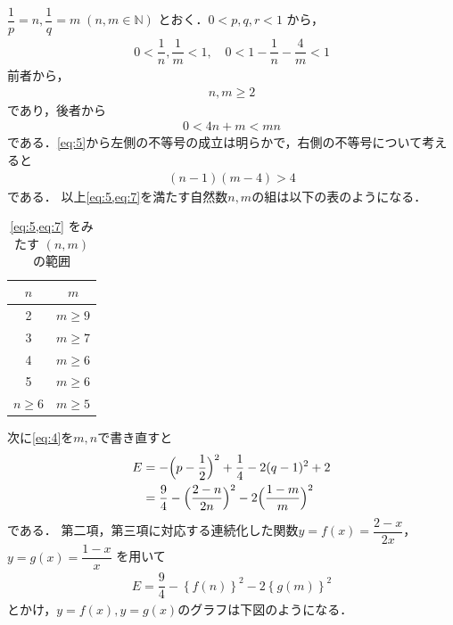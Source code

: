 \documentclass[../../main.tex]{subfiles}
\begin{document}
$\dfrac{1}{p} = n, \dfrac{1}{q} = m \; (n,m \in \mathbb{N})$ とおく．$0 < p, q, r < 1$ から，
\begin{align}
  0 < \dfrac{1}{n}, \dfrac{1}{m} < 1, \quad 0 < 1 - \dfrac{1}{n} - \dfrac{4}{m} < 1
\end{align}
前者から，
\begin{align}
  n, m \ge 2 \label{eq:5}
\end{align}
であり，後者から
\begin{align}
  0 < 4n + m < mn \label{eq:6}
\end{align}
である．\cref{eq:5}から左側の不等号の成立は明らかで，右側の不等号について考えると
\begin{align}
  (n-1)(m-4) > 4 \label{eq:7}
\end{align}
である．
以上\cref{eq:5,eq:7}を満たす自然数$n,m$の組は以下の表のようになる．

\begin{table}[htb]
  \centering
  \caption{\cref{eq:5,eq:7} をみたす $(n,m)$ の範囲}
  \begin{tabular}{c|c}
    $n$ & $m$ \\ \hline
    2 & $m \ge 9$ \\ \hline
    3 & $m \ge 7$ \\ \hline
    4 & $m \ge 6$ \\ \hline
    5 & $m \ge 6$ \\ \hline
    $n \ge 6$ & $m \ge 5$
  \end{tabular}
\end{table}

次に\cref{eq:4}を$m,n$で書き直すと
\begin{align}
  E
  &= -\Bigl(p - \dfrac{1}{2}\Bigr)^2 + \dfrac{1}{4} - 2(q-1)^2 + 2 \\
  &= \dfrac{9}{4} - \Bigl(\dfrac{2-n}{2n}\Bigr)^2 - 2\Bigl(\dfrac{1-m}{m}\Bigr)^2 \label{eq:8}
\end{align}
である．
第二項，第三項に対応する連続化した関数$y = f(x) = \dfrac{2-x}{2x}$， $y = g(x) = \dfrac{1-x}{x}$ を用いて
\begin{align}
  E = \dfrac{9}{4} - \left\{f(n)\right\}^2 - 2\left\{g(m)\right\}^2 \label{eq:9}
\end{align}
とかけ，$y=f(x),y=g(x)$のグラフは下図のようになる．
\end{document}
